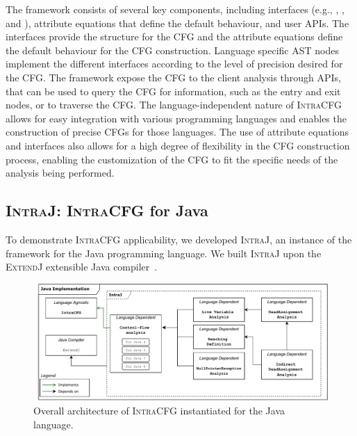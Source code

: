 The framework consists of several key components, including interfaces
(e.g., , , and ), attribute equations that define the
default behaviour, and user APIs. The interfaces provide the structure for the
CFG and the attribute equations define the default behaviour for the CFG
construction. Language specific AST nodes implement the different interfaces
according to the level of precision desired for the CFG.
The framework expose the CFG to the client analysis through APIs, that can be used
to query the CFG for information, such as the entry and exit nodes, or to traverse the CFG.
The language-independent nature of \textsc{IntraCFG} allows for easy integration
with various programming languages and enables the construction of precise CFGs
for those languages. The use of attribute equations and interfaces also allows
for a high degree of flexibility in the CFG construction process,
enabling the customization of the CFG to fit the specific needs of the
analysis being performed.






\subsection{\textsc{IntraJ}: \textsc{IntraCFG} for Java}
To demonstrate \textsc{IntraCFG} applicability, we developed
\textsc{IntraJ}, an instance of the framework for the Java programming language.
We built \textsc{IntraJ} upon the \textsc{ExtendJ} extensible Java compiler~\cite{DBLP:conf/oopsla/EkmanH07}.
\begin{figure}[H]
    \centering
    \includegraphics[scale=0.52]{kappa/img/architecturejava.pdf}
    \caption{\label{fig:intraJ} Overall architecture of \textsc{IntraCFG} instantiated for the Java language.}
\end{figure}

